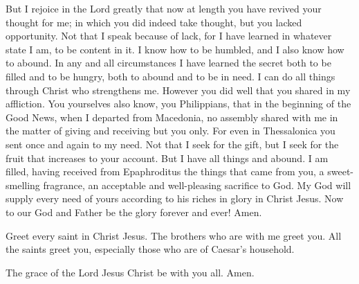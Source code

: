  But I rejoice in the Lord greatly that now at length you
have revived your thought for me; in which you did indeed take thought,
but you lacked opportunity.  Not that I speak because of
lack, for I have learned in whatever state I am, to be content in it.
 I know how to be humbled, and I also know how to abound.
In any and all circumstances I have learned the secret both to be filled
and to be hungry, both to abound and to be in need.  I can
do all things through Christ who strengthens me.  However
you did well that you shared in my affliction.  You
yourselves also know, you Philippians, that in the beginning of the Good
News, when I departed from Macedonia, no assembly shared with me in the
matter of giving and receiving but you only.  For even in
Thessalonica you sent once and again to my need.  Not that
I seek for the gift, but I seek for the fruit that increases to your
account.  But I have all things and abound. I am filled,
having received from Epaphroditus the things that came from you, a
sweet-smelling fragrance, an acceptable and well-pleasing sacrifice to
God.  My God will supply every need of yours according to
his riches in glory in Christ Jesus.  Now to our God and
Father be the glory forever and ever! Amen.

 Greet every saint in Christ Jesus. The brothers who are
with me greet you.  All the saints greet you, especially
those who are of Caesar's household.

 The grace of the Lord Jesus Christ be with you all. Amen.
